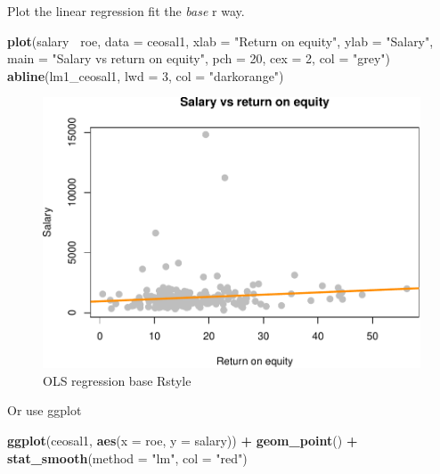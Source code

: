 \documentclass[]{book}
\newenvironment{Shaded}{\begin{snugshade}}{\end{snugshade}}
\newcommand{\DataTypeTok}[1]{\textcolor[rgb]{0.13,0.29,0.53}{#1}}
\newcommand{\DecValTok}[1]{\textcolor[rgb]{0.00,0.00,0.81}{#1}}
\newcommand{\KeywordTok}[1]{\textcolor[rgb]{0.13,0.29,0.53}{\textbf{#1}}}
\newcommand{\NormalTok}[1]{#1}
\newcommand{\OperatorTok}[1]{\textcolor[rgb]{0.81,0.36,0.00}{\textbf{#1}}}
\newcommand{\StringTok}[1]{\textcolor[rgb]{0.31,0.60,0.02}{#1}}
\begin{document}
Plot the linear regression fit the \emph{base} r way.

\begin{Shaded}
\begin{Highlighting}[]
\KeywordTok{plot}\NormalTok{(salary}\OperatorTok{~}\StringTok{ }\NormalTok{roe, }\DataTypeTok{data =}\NormalTok{ ceosal1,}
     \DataTypeTok{xlab =} \StringTok{"Return on equity"}\NormalTok{,}
     \DataTypeTok{ylab =} \StringTok{"Salary"}\NormalTok{,}
     \DataTypeTok{main =} \StringTok{"Salary vs return on equity"}\NormalTok{,}
     \DataTypeTok{pch  =} \DecValTok{20}\NormalTok{,}
     \DataTypeTok{cex  =} \DecValTok{2}\NormalTok{,}
     \DataTypeTok{col  =} \StringTok{"grey"}\NormalTok{)}
\KeywordTok{abline}\NormalTok{(lm1_ceosal1, }\DataTypeTok{lwd =} \DecValTok{3}\NormalTok{, }\DataTypeTok{col =} \StringTok{"darkorange"}\NormalTok{)}
\end{Highlighting}
\end{Shaded}

\begin{figure}

{\centering \includegraphics[width=0.8\linewidth]{MEM5220_R_files/figure-latex/fig1-1} 

}

\caption{OLS regression base Rstyle}\label{fig:fig1}
\end{figure}

Or use ggplot

\begin{Shaded}
\begin{Highlighting}[]
\KeywordTok{ggplot}\NormalTok{(ceosal1, }\KeywordTok{aes}\NormalTok{(}\DataTypeTok{x =}\NormalTok{ roe, }\DataTypeTok{y =}\NormalTok{ salary)) }\OperatorTok{+}\StringTok{ }
\StringTok{  }\KeywordTok{geom_point}\NormalTok{() }\OperatorTok{+}
\StringTok{  }\KeywordTok{stat_smooth}\NormalTok{(}\DataTypeTok{method =} \StringTok{"lm"}\NormalTok{, }\DataTypeTok{col =} \StringTok{"red"}\NormalTok{)}
\end{Highlighting}
\end{Shaded}
\end{document}
